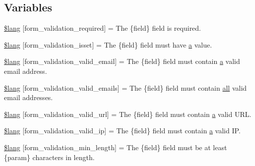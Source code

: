 \subsection*{Variables}
\begin{DoxyCompactItemize}
\item 
\hyperlink{form__validation__lang_8php_a2335c24e2213207c5dda58ec093673a9}{\$lang} \mbox{[}\textquotesingle{}form\+\_\+validation\+\_\+required\textquotesingle{}\mbox{]} = \textquotesingle{}The \{field\} field is required.\textquotesingle{}
\item 
\hyperlink{form__validation__lang_8php_a941575e651258a5a17341aca4e587898}{\$lang} \mbox{[}\textquotesingle{}form\+\_\+validation\+\_\+isset\textquotesingle{}\mbox{]} = \textquotesingle{}The \{field\} field must have \hyperlink{bootstrap_8min_8js_a1f5870dcf487187f13d5fd328ed9e6e7}{a} value.\textquotesingle{}
\item 
\hyperlink{form__validation__lang_8php_a652d5be4d397dcac4407294c2436af34}{\$lang} \mbox{[}\textquotesingle{}form\+\_\+validation\+\_\+valid\+\_\+email\textquotesingle{}\mbox{]} = \textquotesingle{}The \{field\} field must contain \hyperlink{bootstrap_8min_8js_a1f5870dcf487187f13d5fd328ed9e6e7}{a} valid email address.\textquotesingle{}
\item 
\hyperlink{form__validation__lang_8php_af9ec234a36f18a91c981985c3db4333e}{\$lang} \mbox{[}\textquotesingle{}form\+\_\+validation\+\_\+valid\+\_\+emails\textquotesingle{}\mbox{]} = \textquotesingle{}The \{field\} field must contain \hyperlink{change_team_8php_a5f3fcf87333f5770d16608f67ad88d19}{all} valid email addresses.\textquotesingle{}
\item 
\hyperlink{form__validation__lang_8php_af9467e9ed3767f5bff205b79d706fe0a}{\$lang} \mbox{[}\textquotesingle{}form\+\_\+validation\+\_\+valid\+\_\+url\textquotesingle{}\mbox{]} = \textquotesingle{}The \{field\} field must contain \hyperlink{bootstrap_8min_8js_a1f5870dcf487187f13d5fd328ed9e6e7}{a} valid U\+R\+L.\textquotesingle{}
\item 
\hyperlink{form__validation__lang_8php_a8d9bfb49825972af0deee31f8f9dccf2}{\$lang} \mbox{[}\textquotesingle{}form\+\_\+validation\+\_\+valid\+\_\+ip\textquotesingle{}\mbox{]} = \textquotesingle{}The \{field\} field must contain \hyperlink{bootstrap_8min_8js_a1f5870dcf487187f13d5fd328ed9e6e7}{a} valid I\+P.\textquotesingle{}
\item 
\hyperlink{form__validation__lang_8php_a8af94ce29e8a4ac82c976c891b51ffc9}{\$lang} \mbox{[}\textquotesingle{}form\+\_\+validation\+\_\+min\+\_\+length\textquotesingle{}\mbox{]} = \textquotesingle{}The \{field\} field must be at least \{param\} characters in length.\textquotesingle{}

\end{DoxyCompactItemize}
